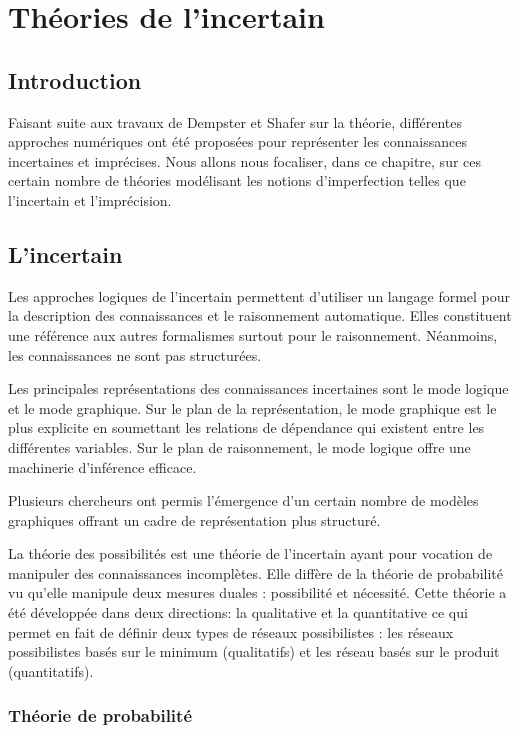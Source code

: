 \chapter{Théories de l'incertain}

{}
\section*{Introduction}
Faisant suite aux travaux de Dempster et Shafer sur la théorie, différentes approches numériques ont été
proposées pour représenter les connaissances incertaines et imprécises. Nous allons nous focaliser, dans ce chapitre, sur ces certain nombre de théories modélisant les notions d’imperfection telles que l’incertain et l’imprécision.

\section{L’incertain}

Les approches logiques de l’incertain permettent d’utiliser un langage formel pour la description des connaissances et le raisonnement automatique. Elles constituent une référence aux autres formalismes surtout pour le raisonnement. Néanmoins, les connaissances ne  sont pas structurées.

Les principales représentations des connaissances incertaines sont le mode logique et le mode graphique\cite{hkhallafiThesis}.
Sur le plan de la représentation, le mode graphique est le plus explicite en soumettant les relations de dépendance qui existent entre les différentes variables. Sur le plan de raisonnement, le mode logique offre une machinerie d’inférence efficace.

Plusieurs chercheurs ont permis l’émergence d’un certain nombre de modèles graphiques offrant un cadre de représentation plus structuré.

La théorie des possibilités est une théorie de l’incertain ayant pour vocation de manipuler des connaissances incomplètes. Elle diffère de la théorie de probabilité  vu qu'elle manipule deux mesures duales : possibilité et nécessité. Cette théorie a été développée dans deux directions: la qualitative et la quantitative ce qui permet en fait de définir deux types de réseaux  possibilistes : les réseaux possibilistes basés sur le minimum (qualitatifs) et les réseau basés sur le produit (quantitatifs)\cite{hkhallafiThesis}\cite{kZebouchi2Thesis}.
\subsection{Théorie de probabilité}

